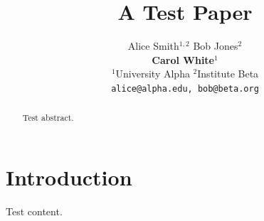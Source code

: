 \documentclass{article}
\title{A Test Paper}
\author{Alice Smith$^{1,2}$ \quad Bob Jones$^{2}$ \\{\bf Carol White$^{1}$} \\
  $^1$University Alpha \quad
  $^2$Institute Beta \\
  \texttt{alice@alpha.edu, bob@beta.org}}
\begin{document}
\maketitle
\begin{abstract}
Test abstract.
\end{abstract}
\section{Introduction}
Test content.
\end{document}

